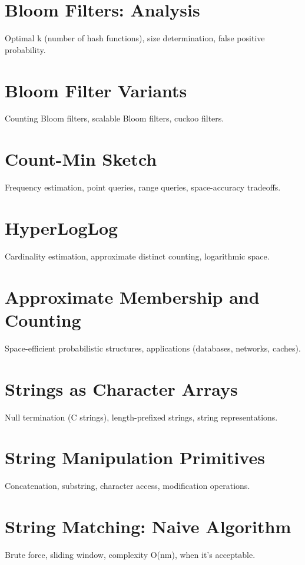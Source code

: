 \chapter{Bloom Filters: Analysis}
Optimal k (number of hash functions), size determination, false positive probability.

\chapter{Bloom Filter Variants}
Counting Bloom filters, scalable Bloom filters, cuckoo filters.

\chapter{Count-Min Sketch}
Frequency estimation, point queries, range queries, space-accuracy tradeoffs.

\chapter{HyperLogLog}
Cardinality estimation, approximate distinct counting, logarithmic space.

\chapter{Approximate Membership and Counting}
Space-efficient probabilistic structures, applications (databases, networks, caches).


\chapter{Strings as Character Arrays}
Null termination (C strings), length-prefixed strings, string representations.

\chapter{String Manipulation Primitives}
Concatenation, substring, character access, modification operations.

\chapter{String Matching: Naive Algorithm}
Brute force, sliding window, complexity O(nm), when it's acceptable.

